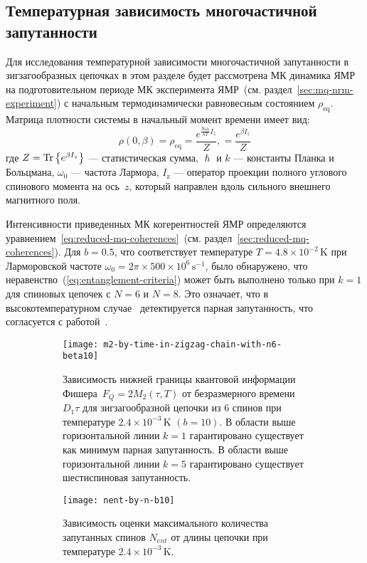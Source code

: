 \subsection{Температурная зависимость многочастичной запутанности}
Для исследования температурной зависимости многочастичной запутанности
в зигзагообразных цепочках
в этом разделе будет рассмотрена МК динамика ЯМР
на подготовительном периоде МК эксперимента ЯМР~(см. раздел~\ref{sec:mq-nrm-experiment})
с начальным термодинамически равновесным состоянием $\rho_\mathrm{eq}$.
Матрица плотности системы в начальный момент времени имеет вид:
\begin{equation}
  \rho(0, \beta)
  = \rho_\mathrm{eq}
  = \dfrac{e^{\frac{\hbar\omega_{0}}{kT} I_z}}{Z},
  = \dfrac{e^{\beta I_z}}{Z}
\end{equation}
где $Z = \mathrm{Tr} \left\{ e^{\beta I_z} \right\}$ --- статистическая сумма,
$\hslash$ и $k$ --- константы Планка и Больцмана,
$\omega_{0}$ --- частота Лармора,
$I_\mathrm{z}$ ---  оператор проекции полного углового спинового момента  на ось~$z$,
который направлен вдоль сильного внешнего магнитного поля.

Интенсивности приведенных МК когерентностей ЯМР определяются уравнением~\ref{eq:reduced-mq-coherences}~(см. раздел~\ref{sec:reduced-mq-coherences}).
Для $b=0.5$,
что соответствует температуре $T=4.8 \times 10^{-2}\,\mbox{K}$
при Ларморовской частоте $\omega_0=2\pi\times 500\times 10^6 \,\mbox{s}^{-1}$,
было обнаружено,
что неравенство~(\ref{eq:entanglement-criteria}) может быть выполнено только при $k=1$ для спиновых цепочек с $N=6$ и $N=8$.
Это означает, что в высокотемпературном случае~\cite{Doronin2019}
детектируется парная запутанность,
что согласуется с работой~\cite{Feldman2012}.

\begin{figure}[H]
  \begin{subfigure}[t]{0.49\textwidth}
    \texttt{[image: m2-by-time-in-zigzag-chain-with-n6-beta10]}
    \caption{
      Зависимость нижней границы квантовой информации
      Фишера~$F_Q=2M_2(\tau, T)$
      от безразмерного времени~$D_1\tau$
      для зигзагообразной цепочки из 6 спинов
      при температуре $2.4\times 10^{-3}\,\mbox{K}$ $(b=10)$.
      В области выше горизонтальной линии $k=1$
      гарантировано существует как минимум парная запутанность.
      В области выше горизонтальной линии $k=5$
      гарантировано существует шестиспиновая запутанность.
    }
    \label{fig:fig3}
  \end{subfigure}
  \hfill
  \begin{subfigure}[t]{0.49\textwidth}
    \texttt{[image: nent-by-n-b10]}
    \caption{
      Зависимость оценки максимального количества запутанных спинов $N_{ent}$ от длины цепочки при температуре $2.4\times 10^{-3}\,\mbox{K}$.
    }
    \label{fig:fig4}
  \end{subfigure}
  \caption{}
\end{figure}

